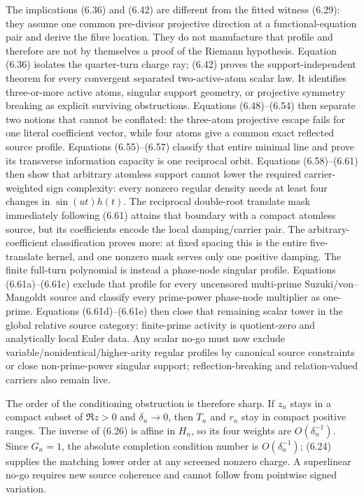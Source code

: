 \documentclass[11pt]{article}
\theoremstyle{definition}
\theoremstyle{remark}
\begin{document}
The implications (6.36) and (6.42) are different from the fitted witness (6.29): they assume one
common pre-divisor projective direction at a functional-equation pair and derive the fibre
location.  They do not manufacture that profile and therefore are not by themselves a proof of
the Riemann hypothesis.  Equation (6.36) isolates the quarter-turn charge ray; (6.42) proves the
support-independent theorem for every convergent separated two-active-atom scalar law.  It
identifies three-or-more active atoms, singular support geometry, or projective symmetry breaking
as explicit surviving obstructions.  Equations (6.48)--(6.54) then separate two notions that
cannot be conflated: the three-atom projective escape fails for one literal coefficient vector,
while four atoms give a common exact reflected source profile.  Equations (6.55)--(6.57)
classify that entire minimal line and prove its transverse information capacity is one reciprocal
orbit.  Equations (6.58)--(6.61) then show that arbitrary atomless support cannot lower the
required carrier-weighted sign complexity: every nonzero regular density needs at least four
changes in $\sin(ut)h(t)$.  The reciprocal double-root translate mask immediately following
(6.61) attains that boundary with a compact atomless source, but its coefficients encode the
local damping/carrier pair.  The arbitrary-coefficient classification proves more: at fixed
spacing this is the entire five-translate kernel, and one nonzero mask serves only one positive
damping.  The finite full-turn polynomial is instead a phase-node singular profile.
Equations (6.61a)--(6.61c) exclude that profile for every uncensored multi-prime
Suzuki/von--Mangoldt source and classify every prime-power phase-node multiplier as one-prime.
Equations (6.61d)--(6.61e) then close that remaining scalar tower in the global relative source
category: finite-prime activity is quotient-zero and analytically local Euler data.  Any scalar
no-go must now exclude variable/nonidentical/higher-arity regular profiles by canonical source
constraints or close non-prime-power singular support; reflection-breaking and relation-valued
carriers also remain live.

The order of the conditioning obstruction is therefore sharp.  If $z_n$ stays in a compact subset
of $\Re z>0$ and $\delta_n\to0$, then $T_n$ and $r_n$ stay in compact positive ranges.  The inverse
of (6.26) is affine in $H_n$, so its four weights are $O(\delta_n^{-1})$.  Since $G_n=1$, the
absolute completion condition number is $O(\delta_n^{-1})$; (6.24) supplies the matching lower
order at any screened nonzero charge.  A superlinear no-go requires new source coherence and
cannot follow from pointwise signed variation.
\end{document}
